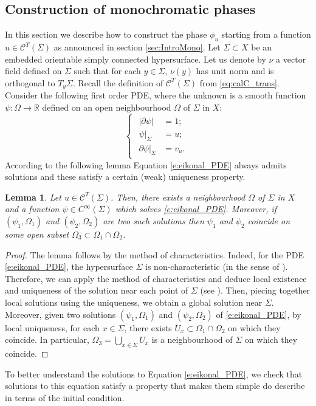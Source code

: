 \documentclass[10pt]{amsart}
\let\mathcal\mathscr
\theoremstyle{plain}
\newtheorem{lemma}[theorem]{Lemma}
\theoremstyle{definition}
\newcommand{\R}{\mathbb{R}}
\def\calC{\mathcal{C}}
\begin{document}
\begin{appendix}
\section{Construction of monochromatic phases}\label{sec:AppMono}
In this section we describe how to construct the phase $\phi_u$ starting from a function $u\in\calC^T(\Sigma)$ as announced in section \ref{sec:IntroMono}. Let $\Sigma\subset X$ be an embedded orientable simply connected hypersurface. Let us denote by $\nu$ a vector field defined on $\Sigma$ such that for each $y\in\Sigma$, $\nu(y)$ has unit norm and is orthogonal to $T_y\Sigma$. Recall the definition of $\mathcal{C}^T(\Sigma)$ from \eqref{eq:calC_trans}. Consider the following first order PDE, where the unknown is a smooth function $\psi:\Omega\to\R$ defined on an open neighbourhood $\Omega$ of $\Sigma$ in $X$:\vspace*{-2pt}
\begin{equation}\label{e:eikonal_PDE}
\begin{cases}
\begin{array}{rl}
|\partial\psi| &=1;\\
\psi|_\Sigma &=u;\\
\partial\psi|_\Sigma &=v_u.
\end{array}
\end{cases}
\end{equation}
According to the following lemma Equation \eqref{e:eikonal_PDE} always admits solutions and these satisfy a certain (weak) uniqueness property.
\begin{lemma}\label{l:existence_uniqueness}
Let $u\in\calC^T(\Sigma)$. Then, there exists a neighbourhood $\Omega$ of $\Sigma$ in $X$ and a function $\psi\in C^\infty(\Sigma)$ which solves \eqref{e:eikonal_PDE}. Moreover, if $(\psi_1,\Omega_1)$ and $(\psi_2,\Omega_2)$ are two such solutions then $\psi_1$ and $\psi_2$ coincide on some open subset $\Omega_3\subset\Omega_1\cap\Omega_2$.
\end{lemma}

\begin{proof}
The lemma follows by the method of characteristics. Indeed, for the PDE \eqref{e:eikonal_PDE}, the hypersurface $\Sigma$ is non-characteristic (in the sense of \cite[(36) p.\,106]{Evans}). Therefore, we can apply the method of characteristics and deduce local existence and uniqueness of the solution near each point of $\Sigma$ (see \cite{Evans}). Then, piecing together local solutions using the uniqueness, we obtain a global solution near $\Sigma$. Moreover, given two solutions $(\psi_1,\Omega_1)$ and $(\psi_2,\Omega_2)$ of \eqref{e:eikonal_PDE}, by local uniqueness, for each $x\in\Sigma$, there exists $U_x\subset\Omega_1\cap\Omega_2$ on which they coincide. In particular, $\Omega_3=\bigcup_{x\in\Sigma} U_x$ is a neighbourhood of $\Sigma$ on which they coincide.
\end{proof}
To better understand the solutions to Equation \eqref{e:eikonal_PDE}, we check that solutions to this equation satisfy a property that makes them simple do describe in terms of the initial condition.


\end{appendix}
\end{document}
